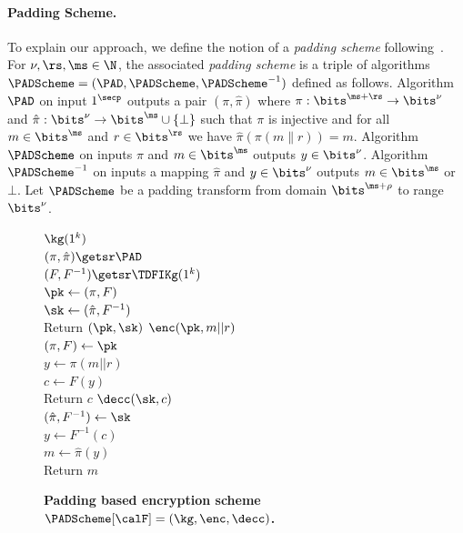\paragraph*{Padding Scheme.}
To explain our approach, we define the notion of a \emph{padding scheme} following~\cite{EC:BelRog94,EC:KilPie09}.
For $\nu, \rs,\ms \in \N$, the associated \emph{padding scheme} is a triple of algorithms $\PADScheme= (\PAD,\PADScheme, \PADScheme^{-1})$ defined as follows.
Algorithm $\PAD$ on input $1^\secp$
outputs a pair $(\pi, \hat{\pi})$ where $\pi: \bits^{\ms+\rs} \to \bits^{\nu}$ and $\hat{\pi}: \bits^{\nu} \to \bits^{\ms} \cup \{\bot\}$ such that $\pi$ is injective and for all $m \in \bits^{\ms}$ and $r \in \bits^\rs$ we have $\hat{\pi}(\pi(m\|r))=m$. 
Algorithm $\PADScheme$ on inputs  $\pi$ and $m \in \bits^{\ms}$ 
outputs $y \in \bits^{\nu}$. Algorithm $\PADScheme^{-1}$ on inputs a mapping $\hat{\pi}$ and $y \in \bits^{\nu}$ 
outputs $m \in \bits^{\ms}$ or $\bot$.
Let $\PADScheme$ be a padding transform from domain $\bits^{\ms + \rho}$ to range $\bits^\nu$.

\begin{figure}[t]
    {\underline{$\kg(1^k)$}\\
    $(\pi, \hat{\pi}) \getsr \PAD$ \\
    $(F,F^{-1}) \getsr \TDFIKg(1^k)$ \\
    $\pk \gets (\pi,F)$ \\
    $\sk \gets (\hat{\pi},F^{-1})$ \\
    Return $(\pk,\sk)$ 
    }{
    \underline{$\enc(\pk,m || r)$} \\
    $(\pi,F) \gets \pk$ \\
    $y \gets \pi(m || r)$\\
    $c \gets F(y)$\\
    Return $c$
    }{
    \underline{$\decc(\sk,c)$} \\
    $(\hat{\pi},F^{-1}) \gets \sk$ \\
    $y \gets F^{-1}(c)$\\
    $m  \gets \hat{\pi}(y)$ \\
    Return $m$
    } \vspace{-1ex}
\caption{\textbf{Padding based encryption scheme $\PADScheme[\calF]=(\kg,\enc,\decc)$.}}
\label{fig:pbe}
\end{figure}

